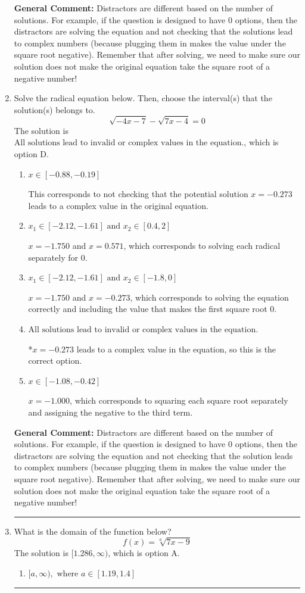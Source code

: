 \documentclass{extbook}[14pt]
\newcommand{\litem}[1]{\item #1

\rule{\textwidth}{0.4pt}}
\begin{document}
\begin{enumerate}
{\textbf{General Comment:} Distractors are different based on the number of solutions. For example, if the question is designed to have 0 options, then the distractors are solving the equation and not checking that the solutions lead to complex numbers (because plugging them in makes the value under the square root negative). Remember that after solving, we need to make sure our solution does not make the original equation take the square root of a negative number!
}
\litem{
Solve the radical equation below. Then, choose the interval(s) that the solution(s) belongs to.
\[ \sqrt{-4 x - 7} - \sqrt{7 x - 4} = 0 \]The solution is \( \text{All solutions lead to invalid or complex values in the equation.} \), which is option D.\begin{enumerate}[label=\Alph*.]
\item \( x \in [-0.88,-0.19] \)

This corresponds to not checking that the potential solution $x = -0.273$ leads to a complex value in the original equation.
\item \( x_1 \in [-2.12, -1.61] \text{ and } x_2 \in [0.4,2] \)

$x = -1.750$ and $x = 0.571$, which corresponds to solving each radical separately for 0.
\item \( x_1 \in [-2.12, -1.61] \text{ and } x_2 \in [-1.8,0] \)

$x = -1.750$ and $x = -0.273$, which corresponds to solving the equation correctly and including the value that makes the first square root 0.
\item \( \text{All solutions lead to invalid or complex values in the equation.} \)

*$x = -0.273$ leads to a complex value in the equation, so this is the correct option.
\item \( x \in [-1.08,-0.42] \)

$x = -1.000$, which corresponds to squaring each square root separately and assigning the negative to the third term.
\end{enumerate}

\textbf{General Comment:} Distractors are different based on the number of solutions. For example, if the question is designed to have 0 options, then the distractors are solving the equation and not checking that the solution leads to complex numbers (because plugging them in makes the value under the square root negative). Remember that after solving, we need to make sure our solution does not make the original equation take the square root of a negative number!
}
\litem{
What is the domain of the function below?
\[ f(x) = \sqrt[6]{7 x - 9} \]The solution is \( [1.286, \infty) \), which is option A.\begin{enumerate}[label=\Alph*.]
\item \( [a, \infty), \text{ where } a \in [1.19, 1.4] \)


\end{enumerate}}
\end{enumerate}
\end{document}
